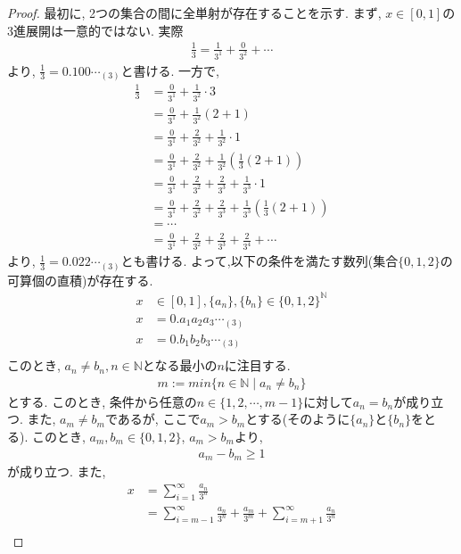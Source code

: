 \documentclass[i]{jsarticle}
\begin{document}
\begin{proof}
最初に, 2つの集合の間に全単射が存在することを示す.
まず, $x \in [0, 1]$の3進展開は一意的ではない. 実際
\begin{align*}
\frac{1}{3} = \frac{1}{3^{1}} + \frac{0}{3^{2}}  + \cdots
\end{align*}
より, $\frac{1}{3}=0.100\cdots_{(3)}$と書ける. 一方で,
\begin{align*}
\frac{1}{3} &= \frac{0}{3^{1}} + \frac{1}{3^{2}}\cdot3 \\
		&= \frac{0}{3^{1}} + \frac{1}{3^{2}}(2 + 1) \\
		&= \frac{0}{3^{1}} + \frac{2}{3^2} + \frac{1}{3^2}\cdot1 \\
		&= \frac{0}{3^{1}} + \frac{2}{3^2} + \frac{1}{3^2}(\frac{1}{3}(2 + 1)) \\
		&= \frac{0}{3^{1}} + \frac{2}{3^2} + \frac{2}{3^3} + \frac{1}{3^3}\cdot1 \\
		&= \frac{0}{3^{1}} + \frac{2}{3^2} + \frac{2}{3^3} + \frac{1}{3^3}(\frac{1}{3}(2 + 1)) \\
		&= \cdots \\
		&= \frac{0}{3^{1}} + \frac{2}{3^2} + \frac{2}{3^3} + \frac{2}{3^4} + \cdots
\end{align*}
より, $\frac{1}{3}=0.022\cdots_{(3)}$とも書ける. よって,以下の条件を満たす数列(集合$\{0, 1, 2\}$の可算個の直積)が存在する.
\begin{align*}
x &\in [0, 1], \{a_n\}, \{b_n\} \in \{0, 1, 2\}^{\mathbb{N}} \\
x &= 0.a_{1}a_{2}a_{3}\cdots_{(3)} \\
x &= 0.b_{1}b_{2}b_{3}\cdots_{(3)} \\
\end{align*}
このとき, $a_{n} \neq b_{n}, n\in\mathbb{N}$となる最小の$n$に注目する.
\begin{align*}
m := min\{n \in \mathbb{N} \mid a_{n} \neq b_{n}\}
\end{align*}
とする. このとき, 条件から任意の$n\in\{1, 2, \cdots, m - 1\}$に対して$a_{n}=b_{n}$が成り立つ. また, $a_{m} \neq b_{m}$であるが, ここで$a_{m} > b_{m}$とする(そのように$\{a_n\}$と$\{b_n\}$をとる). このとき, $a_{m}, b_{m} \in \{0, 1, 2\}$, $a_{m} > b_{m}$より,
\begin{align*}
a_{m} - b_{m} \geq 1
\end{align*}
が成り立つ. また,
\begin{align*}
x &= \sum_{i=1}^{\infty} \frac{a_n}{3^n} \\
   &= \sum_{i=m-1}^{\infty} \frac{a_n}{3^n} + \frac{a_m}{3^m} + \sum_{i=m+1}^{\infty} \frac{a_n}{3^n} \\

\end{align*}
\end{proof}
\end{document}
